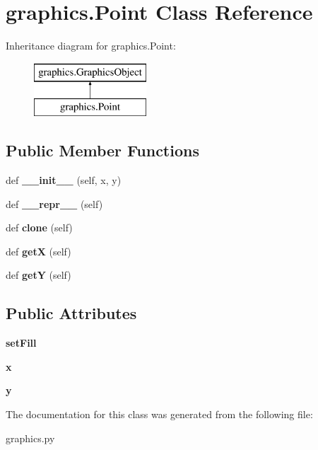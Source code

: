 \hypertarget{classgraphics_1_1_point}{}\section{graphics.\+Point Class Reference}
\label{classgraphics_1_1_point}
Inheritance diagram for graphics.\+Point\+:\begin{figure}[H]
\begin{center}
\leavevmode
\includegraphics[height=2.000000cm]{classgraphics_1_1_point}
\end{center}
\end{figure}
\subsection*{Public Member Functions}
\begin{DoxyCompactItemize}
\item 
\mbox{\label{classgraphics_1_1_point_ab8786043f14e834312522f9a2635ca1c}} 
def {\bfseries \+\_\+\+\_\+init\+\_\+\+\_\+} (self, x, y)
\item 
\mbox{\label{classgraphics_1_1_point_a8dabf610e2e2a1ecdcdadfd16d7c42f6}} 
def {\bfseries \+\_\+\+\_\+repr\+\_\+\+\_\+} (self)
\item 
\mbox{\label{classgraphics_1_1_point_a533526af5c8fbfe84c7c0924c4af7fb5}} 
def {\bfseries clone} (self)
\item 
\mbox{\label{classgraphics_1_1_point_a8a19d0055571c7f1d68df9e9624272a6}} 
def {\bfseries getX} (self)
\item 
\mbox{\label{classgraphics_1_1_point_a48fb2d02f2abf906972cfdae9698fa17}} 
def {\bfseries getY} (self)
\end{DoxyCompactItemize}
\subsection*{Public Attributes}
\begin{DoxyCompactItemize}
\item 
\mbox{\label{classgraphics_1_1_point_a407fd24b47309128a86e144baa128c09}} 
{\bfseries set\+Fill}
\item 
\mbox{\label{classgraphics_1_1_point_a1ecd4579c57a7a0032a630a96bbe173c}} 
{\bfseries x}
\item 
\mbox{\label{classgraphics_1_1_point_a30f1ec4104ee8cb436049ee7aceb8cf4}} 
{\bfseries y}
\end{DoxyCompactItemize}


The documentation for this class was generated from the following file\+:\begin{DoxyCompactItemize}
\item 
graphics.\+py\end{DoxyCompactItemize}
